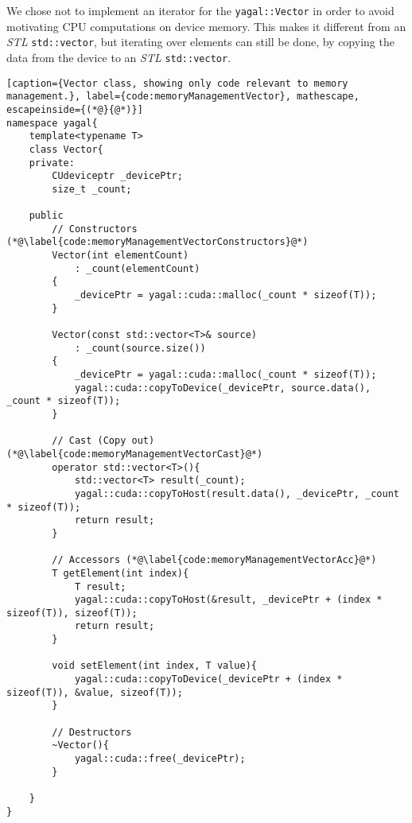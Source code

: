 We chose not to implement an iterator for the \texttt{yagal::Vector} in order to avoid motivating CPU computations on device memory. This makes it different from an \textit{STL} \texttt{std::vector}, but iterating over elements can still be done, by copying the data from the device to an \textit{STL} \texttt{std::vector}.



\begin{lstlisting}[caption={Vector class, showing only code relevant to memory management.}, label={code:memoryManagementVector}, mathescape, escapeinside={(*@}{@*)}]
namespace yagal{
    template<typename T>
    class Vector{
    private:
        CUdeviceptr _devicePtr;
        size_t _count;

    public
        // Constructors (*@\label{code:memoryManagementVectorConstructors}@*)
        Vector(int elementCount)
            : _count(elementCount)
        {
            _devicePtr = yagal::cuda::malloc(_count * sizeof(T));
        }

        Vector(const std::vector<T>& source)
            : _count(source.size())
        {
            _devicePtr = yagal::cuda::malloc(_count * sizeof(T));
            yagal::cuda::copyToDevice(_devicePtr, source.data(), _count * sizeof(T));
        }

        // Cast (Copy out) (*@\label{code:memoryManagementVectorCast}@*)
        operator std::vector<T>(){
            std::vector<T> result(_count);
            yagal::cuda::copyToHost(result.data(), _devicePtr, _count * sizeof(T));
            return result;
        }

        // Accessors (*@\label{code:memoryManagementVectorAcc}@*)
        T getElement(int index){
            T result;
            yagal::cuda::copyToHost(&result, _devicePtr + (index * sizeof(T)), sizeof(T));
            return result;
        }

        void setElement(int index, T value){
            yagal::cuda::copyToDevice(_devicePtr + (index * sizeof(T)), &value, sizeof(T));
        }

        // Destructors
        ~Vector(){
            yagal::cuda::free(_devicePtr);
        }

    }
}
\end{lstlisting}